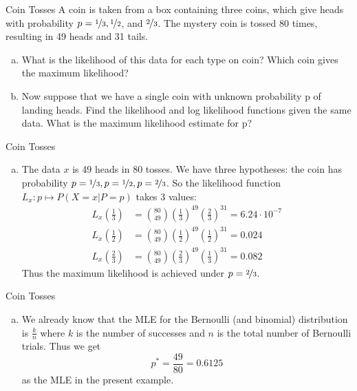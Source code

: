 \documentclass[14pt]{beamer}
\begin{document}
\begin{frame}{Coin Tosses}
\small
A coin is taken from a box containing three coins, which give heads
with probability $ p = \nicefrac{1}{3} , \nicefrac{1}{2} $, and $ \nicefrac{2}{3}$. The mystery coin is 
tossed 80 times, resulting in 49 heads and 31 tails.
\begin{enumerate}[a)]
\item What is the likelihood of this data for each type on coin? Which
coin gives the maximum likelihood?
\item Now suppose that we have a single coin with unknown probability
p of landing heads. Find the likelihood and log likelihood functions
given the same data. What is the maximum likelihood estimate for p?
\end{enumerate}
\end{frame}

\begin{frame}{Coin Tosses}
\small
\begin{enumerate}[a)]
\item The data $ x $ is 49 heads in 80 tosses.
We have three hypotheses: the coin has probability
$ p = \nicefrac{1}{3}, p = \nicefrac{1}{2}, p = \nicefrac{2}{3} $. So the likelihood function $ L_{x} : p \mapsto P(X=x|P=p) $ takes 3 values:
\begin{align*}
L_{x}(\frac{1}{3}) &= \binom{80}{49}\left(\frac{1}{3}\right)^{49}\left(\frac{2}{3}\right)^{31} = 6.24 \cdot 10^{-7} \\
L_{x}(\frac{1}{2}) &= \binom{80}{49}\left(\frac{1}{2}\right)^{49}\left(\frac{1}{2}\right)^{31} = 0.024 \\
L_{x}(\frac{2}{3}) &= \binom{80}{49}\left(\frac{2}{3}\right)^{49}\left(\frac{1}{3}\right)^{31} = 0.082
\end{align*}
Thus the maximum likelihood is achieved under $ p = \nicefrac{2}{3} $.
\end{enumerate}
\end{frame}

\begin{frame}{Coin Tosses}
\begin{enumerate}[b)]
\item We already know that the MLE for the Bernoulli (and binomial) distribution is 
$ \frac{k}{n} $ where $ k $ is the number of successes and $ n $ is the total number of Bernoulli trials.
Thus we get $$ p^{*}=\frac{49}{80} = 0.6125 $$ as the MLE in the present example.
\end{enumerate}
\end{frame}
\end{document}
